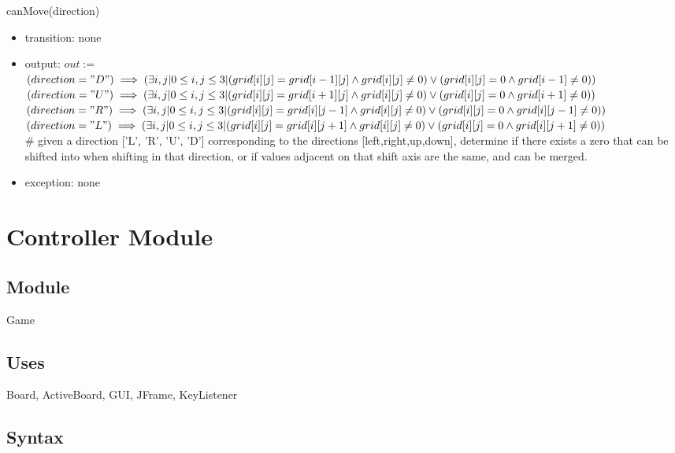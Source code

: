 \documentclass[12pt]{article}
\begin{document}
\noindent canMove(direction)
\begin{itemize}
    \item transition: none
    \item output: $out:= $\\
    $(direction = "D") \implies (\exists i,j| 0 \leq i,j \leq 3|(grid[i][j] = grid[i-1][j] \land grid[i][j] \neq 0) \lor (grid[i][j] = 0 \land grid[i-1] \neq 0))$ \\
    $(direction = "U") \implies (\exists i,j| 0 \leq i,j \leq 3|(grid[i][j] = grid[i+1][j] \land grid[i][j] \neq 0) \lor (grid[i][j] = 0 \land grid[i+1] \neq 0))$ \\
    $(direction = "R") \implies (\exists i,j| 0 \leq i,j \leq 3|(grid[i][j] = grid[i][j-1] \land grid[i][j] \neq 0) \lor (grid[i][j] = 0 \land grid[i][j-1] \neq 0))$ \\
    $(direction = "L") \implies (\exists i,j| 0 \leq i,j \leq 3|(grid[i][j] = grid[i][j+1] \land grid[i][j] \neq 0) \lor (grid[i][j] = 0 \land grid[i][j+1] \neq 0))$ \\
    \# given a direction ['L', 'R', 'U', 'D'] corresponding to the directions [left,right,up,down], determine if there exists a zero that can be shifted into when shifting in that direction, or if values adjacent on that shift axis are the same, and can be merged.
    \item exception: none
\end{itemize}

\newpage

\section* {Controller Module}

\subsection*{Module}

Game

\subsection* {Uses}

Board, ActiveBoard, GUI, JFrame, KeyListener

\subsection* {Syntax}
\end{document}

